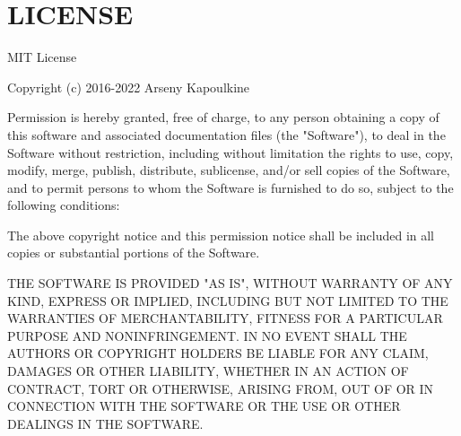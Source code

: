 \chapter{LICENSE}
\hypertarget{md_node__modules_2meshoptimizer_2_l_i_c_e_n_s_e}{}\label{md_node__modules_2meshoptimizer_2_l_i_c_e_n_s_e}
MIT License

Copyright (c) 2016-\/2022 Arseny Kapoulkine

Permission is hereby granted, free of charge, to any person obtaining a copy of this software and associated documentation files (the "{}\+Software"{}), to deal in the Software without restriction, including without limitation the rights to use, copy, modify, merge, publish, distribute, sublicense, and/or sell copies of the Software, and to permit persons to whom the Software is furnished to do so, subject to the following conditions\+:

The above copyright notice and this permission notice shall be included in all copies or substantial portions of the Software.

THE SOFTWARE IS PROVIDED "{}\+AS IS"{}, WITHOUT WARRANTY OF ANY KIND, EXPRESS OR IMPLIED, INCLUDING BUT NOT LIMITED TO THE WARRANTIES OF MERCHANTABILITY, FITNESS FOR A PARTICULAR PURPOSE AND NONINFRINGEMENT. IN NO EVENT SHALL THE AUTHORS OR COPYRIGHT HOLDERS BE LIABLE FOR ANY CLAIM, DAMAGES OR OTHER LIABILITY, WHETHER IN AN ACTION OF CONTRACT, TORT OR OTHERWISE, ARISING FROM, OUT OF OR IN CONNECTION WITH THE SOFTWARE OR THE USE OR OTHER DEALINGS IN THE SOFTWARE. 